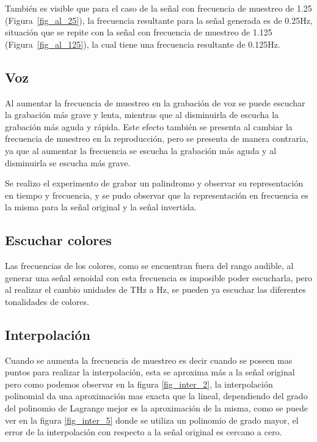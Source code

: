 \documentclass[comsoc, journal]{IEEEtran}
\begin{document}
También es visible que para el caso de la señal con frecuencia de muestreo de 1.25 (Figura~\ref{fig_al_25}), la frecuencia resultante para la señal generada es de 0.25Hz, situación que se repite con la señal con frecuencia de muestreo de 1.125 (Figura~\ref{fig_al_125}), la cual tiene una frecuencia resultante de 0.125Hz.

\subsection{Voz}
Al aumentar la frecuencia de muestreo en la grabación de voz se puede escuchar la grabación más grave y lenta, mientras que al disminuirla de escucha la grabación más aguda y rápida. Este efecto también se presenta al cambiar la frecuencia de muestreo en la reproducción, pero se presenta de manera contraria, ya que al aumentar la frecuencia se escucha la grabación más aguda y al disminuirla se escucha más grave.

Se realizo el experimento de grabar un palindromo y observar su representación en tiempo y frecuencia, y se pudo observar que la representación en frecuencia es la misma para la señal original y la señal invertida.

\subsection{Escuchar colores}
Las frecuencias de los colores, como se encuentran fuera del rango audible, al generar una señal senoidal con esta frecuencia es imposible poder escucharla, pero al realizar el cambio unidades de THz a Hz, se pueden ya escuchar las diferentes tonalidades de colores.

\subsection{Interpolación}

Cuando se aumenta la frecuencia de muestreo es decir cuando se poseen mas puntos para realizar la interpolación, esta se aproxima más a la señal original pero como podemos observar en la figura \ref{fig_inter_2}, la interpolación polinomial da una aproximación mas exacta que la lineal, dependiendo del grado del polinomio de Lagrange mejor es la aproximación de la misma, como se puede ver en la figura \ref{fig_inter_5} donde se utiliza un polinomio de grado mayor, el error de la interpolación con respecto a la señal original es cercano a cero.
\end{document}
